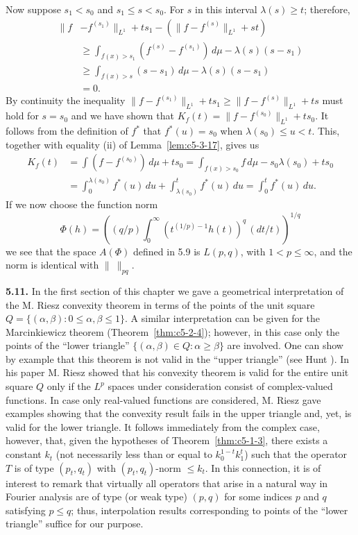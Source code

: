 Now suppose $s_{1} < s_{0}$ and $s_{1} \leq s < s_{0}$. For $s$ in this
interval $\lambda(s) \geq t$; therefore,
\begin{align*}
\|f&-f^{(s_{1})}\|_{L^{1}}+ts_{1}-(\|f-f^{(s)}\|_{L^{1}}+st)\\
&\geq\int_{f(x)>s_{1}}(f^{(s)}-f^{(s_{1})})\,d\mu-\lambda(s)(s-s_{1})\\
&\geq\int_{f(x)>s}(s-s_{1})\,d\mu-\lambda(s)(s-s_{1})\\
&=0.
\end{align*}
By continuity the inequality
$\|f - f^{(s_{1})}\|_{L^{1}} + ts_{1} \geq \|f - f^{(s)}\|_{L^{1}} + ts$ must
hold for $s = s_{0}$ and we have shown that
$K_{f}(t) = \|f - f^{(s_{0})}\|_{L^{1}} + ts_{0}$. It follows from the
definition of $f^{*}$ that $f^{*}(u) = s_{0}$ when $\lambda(s_{0}) \leq u < t$.
This, together with equality (ii) of Lemma~\ref{lem:c5-3-17}, gives us
\begin{align*}
K_{f}(t)&=\int(f-f^{(s_{0})})\,d\mu+ts_{0}
=\int_{f(x)>s_{0}}f\,d\mu-s_{0}\lambda(s_{0})+ts_{0}\\
&=\int_{0}^{\lambda(s_{0})}f^{*}(u)\,du+\int_{\lambda(s_{0})}^{t}f^{*}(u)\,du
=\int_{0}^{t}f^{*}(u)\,du.
\end{align*}
If we now choose the function norm
\[
\Phi(h)=\left((q/p)\int_{0}^{\infty}(t^{(1/p)-1}h(t))^{q}\,(dt/t)\right)^{1/q}
\]
we see that the space $A(\Phi)$ defined in 5.9 is $L(p, q)$, with
$1 < p \leq \infty$, and the norm is identical with $\|\ \|_{pq}$.

\textbf{5.11.} In the first section of this chapter we gave a geometrical
interpretation of the M. Riesz convexity theorem in terms of the points of the
unit square $Q = \{(\alpha, \beta) : 0 \leq \alpha, \beta \leq 1\}$. A similar
interpretation can be given for the Marcinkiewicz theorem
(Theorem~\ref{thm:c5-2-4}); however, in this case only the points of the
``lower triangle'' $\{(\alpha, \beta) \in Q : \alpha \geq \beta\}$ are
involved. One can show by example that this theorem is not valid in the
``upper triangle'' (see Hunt \cite{Hunt1}). In his paper \cite{Riesz2} M. Riesz
showed that his convexity theorem is valid for the entire unit square $Q$ only
if the $L^{p}$ spaces under consideration consist of complex-valued functions.
In case only real-valued functions are considered, M. Riesz gave examples
showing that the convexity result fails in the upper triangle and, yet, is
valid for the lower triangle. It follows immediately from the complex case,
however, that, given the hypotheses of Theorem~\ref{thm:c5-1-3}, there exists a
constant $k_{t}$ (not necessarily less than or equal to $k_{0}^{1-t}k_{1}^{t}$)
such that the operator $T$ is of type $(p_{t}, q_{t})$ with
$(p_{t}, q_{t})$-norm $\leq k_{t}$. In this connection, it is of interest to
remark that virtually all operators that arise in a natural way in Fourier
analysis are of type (or weak type) $(p, q)$ for some indices $p$ and $q$
satisfying $p \leq q$; thus, interpolation results corresponding to points of
the ``lower triangle'' suffice for our purpose.

